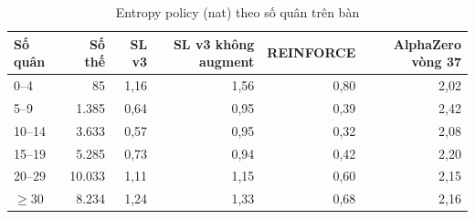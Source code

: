 \begin{table}[H]
  \centering
  \footnotesize
  \caption{Entropy policy (nat) theo số quân trên bàn}
  \label{tab:cs-mang-giaidoan-entropy}
  \begin{tabular}{lrrrrr}
    \toprule
    Số quân & Số thế & SL v3 & SL v3 không augment & REINFORCE & AlphaZero vòng 37 \\
    \midrule
    0--4 & 85 & 1,16 & 1,56 & 0,80 & 2,02 \\
    5--9 & 1.385 & 0,64 & 0,95 & 0,39 & 2,42 \\
    10--14 & 3.633 & 0,57 & 0,95 & 0,32 & 2,08 \\
    15--19 & 5.285 & 0,73 & 0,94 & 0,42 & 2,20 \\
    20--29 & 10.033 & 1,11 & 1,15 & 0,60 & 2,15 \\
    $\ge 30$ & 8.234 & 1,24 & 1,33 & 0,68 & 2,16 \\
    \bottomrule
  \end{tabular}
\end{table}
